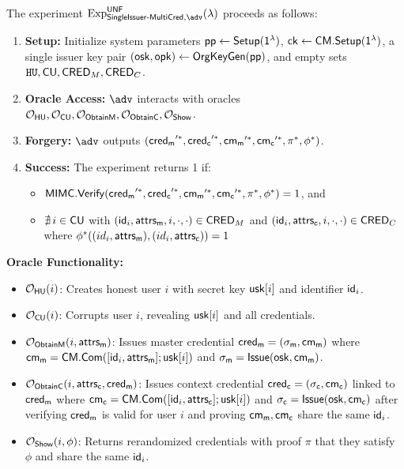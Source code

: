 \noindent The experiment $\mathrm{Exp}^{\mathsf{UNF}}_{\mathsf{SingleIssuer\text{-}MultiCred}, \adv}(\lambda)$ proceeds as follows:

\begin{enumerate}
    \item \textbf{Setup:} Initialize system parameters $\mathsf{pp} \gets \mathsf{Setup}(\mathsf{1^{\lambda}})$, $\mathsf{ck} \gets \mathsf{CM.Setup}(\mathsf{1^{\lambda}})$, a single issuer key pair $(\mathsf{osk}, \mathsf{opk}) \gets \mathsf{OrgKeyGen}(\mathsf{pp})$, and empty sets $\mathtt{HU}, \mathsf{CU}, \mathsf{CRED}_M, \mathsf{CRED}_C$.
    
    \item \textbf{Oracle Access:} $\adv$ interacts with oracles $\mathcal{O}_{\mathsf{HU}}, \mathcal{O}_{\mathsf{CU}}, \mathcal{O}_{\mathsf{ObtainM}}, \mathcal{O}_{\mathsf{ObtainC}}, \mathcal{O}_{\mathsf{Show}}$.
    
    \item \textbf{Forgery:} $\adv$ outputs $(\mathsf{cred_m}'^*, \mathsf{cred_c}'^*, \mathsf{cm_m}'^*, \mathsf{cm_c}'^*, \pi^*, \phi^*)$.
    
    \item \textbf{Success:} The experiment returns 1 if:
    \begin{itemize}
        \item $\mathsf{MIMC.Verify}(\mathsf{cred_m}'^*, \mathsf{cred_c}'^*, \mathsf{cm_m}'^*, \mathsf{cm_c}'^*, \pi^*, \phi^*) = 1$, and
        \item $\nexists\, i \in \mathsf{CU}$ with $(\mathsf{id}_i, \mathsf{attrs_m}, i, \cdot, \cdot) \in \mathsf{CRED}_M$ and $(\mathsf{id}_i, \mathsf{attrs_c}, i, \cdot, \cdot) \in \mathsf{CRED}_C$ where $\phi^*((id_i, \mathsf{attrs_m}), (id_i, \mathsf{attrs_c})) = 1$
    \end{itemize}
\end{enumerate}

\noindent \textbf{Oracle Functionality:}

\begin{itemize}
    \item $\mathcal{O}_{\mathsf{HU}}(i)$: Creates honest user $i$ with secret key $\mathsf{usk}[i]$ and identifier $\mathsf{id}_i$.
    
    \item $\mathcal{O}_{\mathsf{CU}}(i)$: Corrupts user $i$, revealing $\mathsf{usk}[i]$ and all credentials.
    
    \item $\mathcal{O}_{\mathsf{ObtainM}}(i, \mathsf{attrs_m})$: Issues master credential $\mathsf{cred_m} = (\sigma_{\mathsf{m}}, \mathsf{cm_m})$ where $\mathsf{cm_m} = \mathsf{CM.Com}([\mathsf{id}_i, \mathsf{attrs_m}]; \mathsf{usk}[i])$ and $\sigma_{\mathsf{m}} = \mathsf{Issue}(\mathsf{osk}, \mathsf{cm_m})$.
    
    \item $\mathcal{O}_{\mathsf{ObtainC}}(i, \mathsf{attrs_c}, \mathsf{cred_m})$: Issues context credential $\mathsf{cred_c} = (\sigma_{\mathsf{c}}, \mathsf{cm_c})$ linked to $\mathsf{cred_m}$ where $\mathsf{cm_c} = \mathsf{CM.Com}([\mathsf{id}_i, \mathsf{attrs_c}]; \mathsf{usk}[i])$ and $\sigma_{\mathsf{c}} = \mathsf{Issue}(\mathsf{osk}, \mathsf{cm_c})$ after verifying $\mathsf{cred_m}$ is valid for user $i$ and proving $\mathsf{cm_m}, \mathsf{cm_c}$ share the same $\mathsf{id}_i$.
    
    \item $\mathcal{O}_{\mathsf{Show}}(i, \phi)$: Returns rerandomized credentials with proof $\pi$ that they satisfy $\phi$ and share the same $\mathsf{id}_i$.
\end{itemize}

